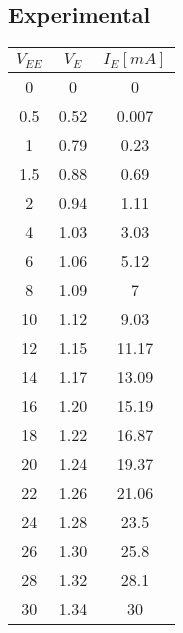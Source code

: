 \subsection{Experimental}
\begin{minipage}{0.2\linewidth}
\begin{tabular}{c|c|c}
  $V_{EE}$ &$V_{E}$ &$I_{E} [mA]$  \\
  \hline
  0   &0      &0       \\
  0.5 &0.52   &0.007   \\
  1   &0.79   &0.23    \\
  1.5 &0.88   &0.69    \\
  2   &0.94   &1.11    \\
  4   &1.03   &3.03    \\
  6   &1.06   &5.12    \\
  8   &1.09   &7       \\
  10  &1.12   &9.03    \\
  12  &1.15   &11.17   \\
  14  &1.17   &13.09   \\
  16  &1.20   &15.19   \\
  18  &1.22   &16.87   \\
  20  &1.24   &19.37   \\
  22  &1.26   &21.06   \\
  24  &1.28   &23.5    \\
  26  &1.30   &25.8    \\
  28  &1.32   &28.1    \\
  30  &1.34   &30
\end{tabular}
\end{minipage}
